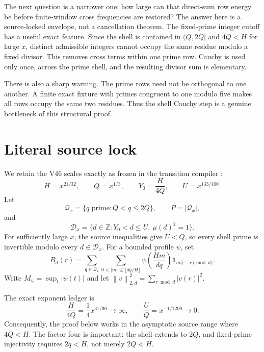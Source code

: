 \documentclass[11pt]{article}
\theoremstyle{definition}
\theoremstyle{remark}
\newcommand{\Qx}{\mathcal Q_x}
\newcommand{\Dx}{\mathcal D_x}
\newcommand{\ZZ}{\mathbb Z}
\newcommand{\one}{\mathbf 1}
\newcommand{\norm}[1]{\left\lVert #1\right\rVert}
\begin{document}
The next question is a narrower one: how large can that direct-sum row energy
be before finite-window cross frequencies are restored?  The answer here is a
source-locked envelope, not a cancellation theorem.  The fixed-prime integer
cutoff has a useful exact feature.  Since the shell is contained in \((Q,2Q]\)
and \(4Q<H\) for large \(x\), distinct admissible integers cannot occupy the
same residue modulo a fixed divisor.  This removes cross terms within one
prime row.  Cauchy is used only once, across the prime shell, and the resulting
divisor sum is elementary.

There is also a sharp warning.  The prime rows need not be orthogonal to one
another.  A finite exact fixture with primes congruent to one modulo five makes
all rows occupy the same two residues.  Thus the shell Cauchy step is a genuine
bottleneck of this structural proof.

\section{Literal source lock}

We retain the V46 scales exactly as frozen in the transition compiler
\cite{WangV46}:
\begin{equation}
 H=x^{21/32},\qquad Q=x^{1/3},\qquad
 Y_0=\frac{H}{4Q},\qquad U=x^{133/400}.
 \label{eq:scales}
\end{equation}
Let
\begin{equation}
 \Qx=\{q\text{ prime}:Q<q\le 2Q\},\qquad P=|\Qx|,
 \label{eq:shell}
\end{equation}
and
\begin{equation}
 \Dx=\{d\in\ZZ:Y_0<d\le U,\ \mu(d)^2=1\}.
 \label{eq:band}
\end{equation}
For sufficiently large \(x\), the source inequalities give \(U<Q\), so
every shell prime is invertible modulo every \(d\in\Dx\).  For a bounded
profile \(\psi\), set
\begin{equation}
 B_d(r)=\sum_{q\in\Qx}\sum_{0<|m|\le\lfloor dq/H\rfloor}
 \psi\!\left(\frac{Hm}{dq}\right)
 \one_{m\overline q\equiv r\pmod d}.
 \label{eq:emitter}
\end{equation}
Write \(M_\psi=\sup_t|\psi(t)|\) and let
\(\norm{v}_{2,d}^2=\sum_{r\bmod d}|v(r)|^2\).

The exact exponent ledger is
\begin{equation}
 \frac{H}{4Q}=\frac14x^{31/96}\longrightarrow\infty,
 \qquad \frac{U}{Q}=x^{-1/1200}\longrightarrow0.
 \label{eq:source-inequalities}
\end{equation}
Consequently, the proof below works in the asymptotic source range where
\(4Q<H\).  The factor four is important: the shell extends to \(2Q\), and
fixed-prime injectivity requires \(2q<H\), not merely \(2Q<H\).
\end{document}
